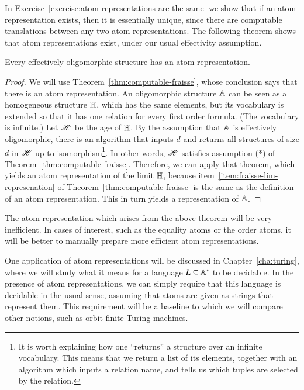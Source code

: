 In Exercise~\ref{exercise:atom-representations-are-the-same} we show that if an atom representation exists, then it is essentially unique, since there are computable translations between any two atom representations. The following theorem shows that atom representations exist, under our usual effectivity assumption. 
\begin{theorem}\label{thm:atom-represenation-must-exist}
Every  effectively oligomorphic structure has an atom representation.
\end{theorem}
\begin{proof}
	We will use Theorem~\ref{thm:computable-fraisse}, whose conclusion says that there is an atom representation.  
		An oligomorphic structure $\mathbb A$  can be seen as a homogeneous structure $\mathbb H$, which has the same elements, but its  vocabulary is extended so that it has one relation for every first order formula. 
	(The vocabulary is infinite.)  Let $\mathscr H$ be the age of $\mathbb H$. By the assumption that $\mathbb A$ is effectively oligomorphic, there is an algorithm that inputs $d$ and returns 
all structures of size $d$ in $\mathscr H$ up to isomorphism\footnote{It is worth explaining how one ``returns'' a structure over an infinite vocabulary. This means that we return a list of its elements, together with an algorithm which inputs a relation name, and tells us which tuples are selected by the relation.}. In other words, $\mathscr H$ satisfies  assumption (*) of Theorem~\ref{thm:computable-fraisse}. Therefore, we can apply that theorem, which yields an atom representation of the \fraisse limit $\mathbb H$, because item~\ref{item:fraisse-lim-represenation} of Theorem~\ref{thm:computable-fraisse} is the same as the definition of an atom representation. This in  turn yields a representation of $\mathbb A$. 
\end{proof}

The atom representation which arises from the above theorem will be very inefficient.  In cases of interest, such as the equality atoms or the order atoms, it will be better to manually prepare more efficient atom representations.

One  application of atom representations will be discussed in Chapter~\ref{cha:turing}, where we will study what it means for a language $L \subseteq \mathbb A^*$ to be decidable. In the presence of atom representations, we can simply require that this language is decidable in the usual sense, assuming that atoms are given as strings that represent them. This requirement will be a baseline to which we will compare other notions, such as orbit-finite Turing machines. 

